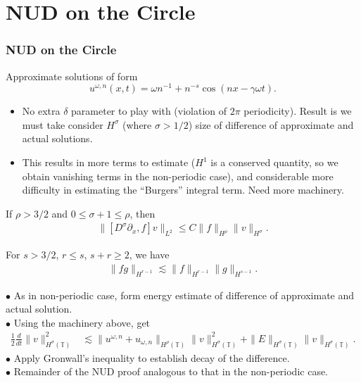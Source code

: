 \documentclass{beamer}
\newcommand{\p}{\partial}
\newcommand{\ci}{\mathbb{T}}
\begin{document}
\section{NUD on the Circle}
\begin{frame}
	\frametitle{NUD on the Circle}
Approximate solutions of form
%
\begin{equation*}
\label{approx-solutions-form}
u^{\omega,n}(x,t) = \omega n^{-1} + n^{-s} \cos \left( nx - \gamma \omega t
\right).
\end{equation*}
%
\pause
%
\begin{itemize}
  \item{} No extra $\delta$ parameter to play with (violation of $2 \pi$ periodicity). Result is we must take consider $H^{\sigma}$ (where $\sigma >1/2$) size of difference of approximate and actual solutions.
    \pause
  \item{} This results in more terms to estimate ($H^{1}$ is a conserved quantity, so we obtain vanishing terms in the non-periodic case), and considerable more difficulty in estimating the ``Burgers'' integral term. Need more machinery.
\end{itemize}
%
\end{frame}
%
%
%
%
%
\begin{frame}
  \begin{lemma}
\label{cor1}
If $\rho > 3/2$ and $0 \le \sigma + 1 \le \rho$, then
%
%
\begin{equation*}
\begin{split}
\|[D^\sigma \p_x ,f]v\|_{L^2} \le C \|f\|_{H^\rho} \|v\|_{H^\sigma}.
\label{15}
\end{split}
\end{equation*}
%
%
\end{lemma}
%
%
\begin{lemma}
  \label{lem:frac-deriv}
For $s > 3/2$, $r \le s$, $s + r \ge 2$, we have
%
%
\begin{equation*}
\begin{split}
  \| fg \|_{H^{r-1}} \lesssim \| f \|_{H^{r-1}} \| g \|_{H^{s-1}}.
\end{split}
\end{equation*}
%
%
\end{lemma}
%
%
\end{frame}
%
%
%
%
\begin{frame}
  $\bullet$ As in non-periodic case, form energy estimate of difference of approximate and actual solution. 
  \\
  $\bullet$
  Using the machinery above, get
%
%
\begin{equation*}
\begin{split}
\frac{1}{2}\frac{d}{dt} \|v\|_{H^\sigma(\ci)}^2
& \lesssim
\|u^{\omega,n} + u_{\omega,n}\|_{H^{\rho}(\ci)} \|v\|_{H^\sigma(\ci)}^2
+ \|E\|_{H^\sigma(\ci)}
\|v\|_{H^\sigma(\ci)}.
\label{10}
\end{split}
\end{equation*}
%
%
%
%
\pause
$\bullet$ Apply Gronwall's inequality to establish decay of the difference. 
\\
$\bullet$ Remainder of the NUD proof analogous to that in the non-periodic case.
\end{frame}
\end{document}
